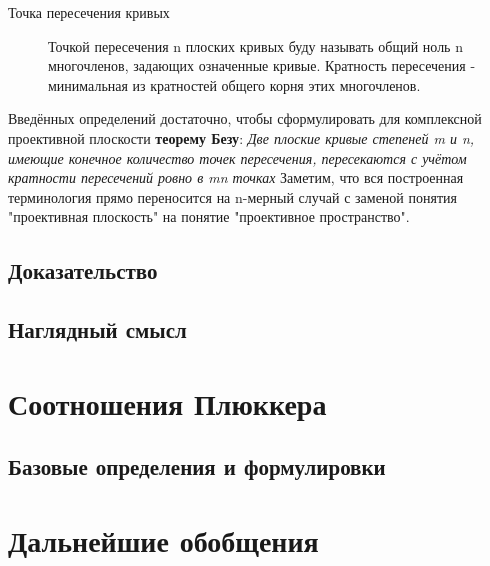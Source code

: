 \documentclass[a4paper, 12pt]{article}
\begin{document}
\begin{description}
\item[Точка пересечения кривых]
Точкой пересечения n плоских кривых буду называть общий ноль n многочленов, задающих означенные кривые. Кратность пересечения - минимальная из кратностей общего корня этих многочленов.
\end{description}
Введённых определений достаточно, чтобы сформулировать для комплексной проективной плоскости \textbf{теорему Безу}:
\textit{Две плоские кривые степеней m и n, имеющие конечное количество точек пересечения, пересекаются с учётом кратности пересечений ровно в mn точках}
Заметим, что вся построенная терминология прямо переносится на n-мерный случай с заменой понятия "проективная плоскость" на понятие "проективное пространство".
\subsection{Доказательство}

\subsection{Наглядный смысл}
\section{Соотношения Плюккера}
\subsection{Базовые определения и формулировки}
\section{Дальнейшие обобщения}
\end{document}

